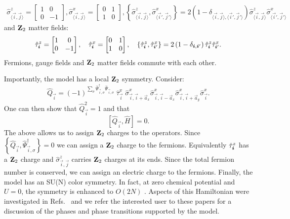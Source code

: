 \begin{align}
\hat{\sigma}^{z}_{\langle \vec{i}, \vec{j} \rangle}  = 
\begin{bmatrix}
1 & 0 \\
0 & -1 
\end{bmatrix},  
\hat{\sigma}^x_{\langle \vec{i}, \vec{j} \rangle}  = 
\begin{bmatrix}
0 & 1 \\
1 & 0 
\end{bmatrix},   
\left\{ \hat{\sigma}^{z}_{\langle \vec{i}, \vec{j} \rangle} , \hat{\sigma}^x_{\langle \vec{i}', \vec{j}'  \rangle} \right\}  =  2 \left( 1 -  \delta_{\langle \vec{i}, \vec{j}  \rangle, \langle \vec{i}', \vec{j}'  \rangle } \right) 
\hat{\sigma}^{z}_{\langle \vec{i}, \vec{j} \rangle}  \hat{\sigma}^x_{\langle \vec{i}', \vec{j}'  \rangle}
\end{align}
and  $\mathbf{Z}_{2}$ matter fields:
\begin{align}
 \hat{\tau}_{\boldsymbol{i}}^{z} = 
\begin{bmatrix}
1 & 0 \\
0 & -1 
\end{bmatrix},\quad
\hat{\tau}^{x}_{\boldsymbol{i} }  = 
\begin{bmatrix}
0 & 1 \\
1 & 0 
\end{bmatrix},\quad 
\left\{ \hat{\tau}^{z}_{ \boldsymbol{i} }, \hat{\tau}^x_{\boldsymbol{i}'} \right\}  =  2 \left( 1 -  \delta_{ \boldsymbol{i}, \boldsymbol{i}' } \right) 
\hat{\tau}^{z}_{ \boldsymbol{i} }  \hat{\tau}^x_{ \boldsymbol{i}' }.
\end{align}
 Fermions,  gauge fields and $\mathbf{Z}_{2}$ matter fields commute with each other. 
 
 Importantly,  the model has a local  $\mathbf{Z}_{2}$ symmetry. Consider:
\begin{equation}
	\hat{Q}_{\vec{i}} =  (-1)^{\sum_{\sigma} \hat{\Psi}^{\dagger}_{\vec{i},\sigma} \hat{\Psi}^{\phantom{\dagger}}_{\vec{i},\sigma}   } 
	\;  \hat{\tau}^{x}_{\vec{i}}  \; \hat{\sigma}^{x}_{\vec{i},\vec{i} +  \vec{a}_x} \hat{\sigma}^{x}_{\vec{i},\vec{i} -  \vec{a}_x} \hat{\sigma}^{x}_{\vec{i},\vec{i} +  \vec{a}_y} \hat{\sigma}^{x}_{\vec{i}}.
\end{equation} 
One can  then show that  $\hat{Q}_{\vec{i}}^2 = 1 $ and that
\begin{equation}
	\left[   \hat{Q}_{\vec{i}}, \hat{H}  \right]  = 0. 
\end{equation} 
The above allows us to assign $\mathbf{Z}_{2}$  charges to the operators.   Since $ \left\{ \hat{Q}_{\vec{i}},   \hat{\Psi}^{\dagger}_{\vec{i},\sigma} \right\} =    0 $ we can assign a $\mathbf{Z}_{2}$  charge to the fermions.  Equivalently 
$\hat{\tau}^{z}_{\boldsymbol{i}}$   has a $\mathbf{Z}_{2}$ charge and $\hat{\sigma}^{z}_{\vec{i},\vec{j}} $   carries  $\mathbf{Z}_{2}$ charges at its ends.   
 Since the total fermion number is conserved,   we can assign an electric charge to the  fermions.
Finally, the model has an SU(N) color symmetry.
In fact, at zero chemical potential and $U=0$, the symmetry is enhanced to $O(2N)$ \cite{Assaad16}.
Aspects of this Hamiltonian were investigated in Refs.~\cite{Assaad16,Gazit16,Gazit18,Gazit19,Hohenadler18,Hohenadler19} and we refer the interested user to these papers for a discussion of the phases and phase transitions supported by the model.


